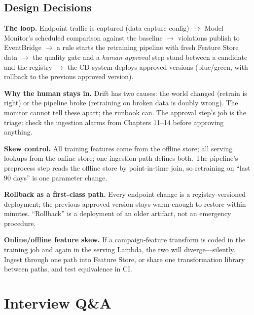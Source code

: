 \subsection{Design Decisions}
\textbf{The loop.} Endpoint traffic is captured (data capture config) $\rightarrow$ Model Monitor's scheduled comparison against the baseline $\rightarrow$ violations publish to EventBridge $\rightarrow$ a rule starts the retraining pipeline with fresh Feature Store data $\rightarrow$ the quality gate and a \emph{human approval} step stand between a candidate and the registry $\rightarrow$ the CD system deploys approved versions (blue/green, with rollback to the previous approved version).

\textbf{Why the human stays in.} Drift has two causes: the world changed (retrain is right) or the pipeline broke (retraining on broken data is doubly wrong). The monitor cannot tell these apart; the runbook can. The approval step's job is the triage: check the ingestion alarms from Chapters 11--14 before approving anything.

\textbf{Skew control.} All training features come from the offline store; all serving lookups from the online store; one ingestion path defines both. The pipeline's preprocess step reads the offline store by point-in-time join, so retraining on ``last 90 days'' is one parameter change.

\textbf{Rollback as a first-class path.} Every endpoint change is a registry-versioned deployment; the previous approved version stays warm enough to restore within minutes. ``Rollback'' is a deployment of an older artifact, not an emergency procedure.

\begin{pitfall}
\textbf{Online/offline feature skew.} If a campaign-feature transform is coded in the training job and again in the serving Lambda, the two will diverge---silently. Ingest through one path into Feature Store, or share one transformation library between paths, and test equivalence in CI.
\end{pitfall}

\section{Interview Q\&A}
